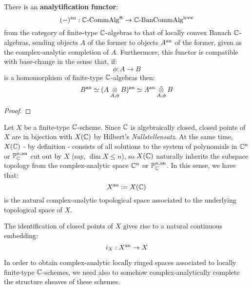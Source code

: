         \begin{lemma} \label{lemma: complex_analytic_completions_of_finite_type_C_algebras}
            There is an \textbf{analytification functor}:
                $$(-)^{\mathrm{an}}: \mathbb{C}\text{-}\mathrm{Comm}\mathrm{Alg}^{\mathrm{ft}} \to \mathbb{C}\text{-}\mathrm{Ban}\mathrm{Comm}\mathrm{Alg}^{\mathrm{lcvx}}$$
            from the category of finite-type $\mathbb{C}$-algebras to that of locally convex Banach $\mathbb{C}$-algebras, sending objects $A$ of the former to objects $A^{\mathrm{an}}$ of the former, given as the complex-analytic completion of $A$. Furthermore, this functor is compatible with base-change in the sense that, if:
                $$\phi: A \to B$$
            is a homomorphism of finite-type $\mathbb{C}$-algebras then:
                $$B^{\an} \cong (A \tensor_{A, \phi} B)^{\an} \cong A^{\an} \hattensor_{A, \phi} B$$
        \end{lemma}
            \begin{proof}
                
            \end{proof}
        \begin{remark} \label{remark: associated_complex_analytic_topological_spaces}
            Let $X$ be a finite-type $\mathbb{C}$-scheme. Since $\mathbb{C}$ is algebraically closed, closed points of $X$ are in bijection with $X(\mathbb{C})$ by Hilbert's \textit{Nullstellensatz}. At the same time, $X(\mathbb{C})$ - by definition - consists of all solutions to the system of polynomials in $\mathbb{C}^n$ or $\mathbb{P}^{n, \mathrm{an}}_{\mathbb{C}}$ cut out by $X$ (say, $\dim X \leq n$), so $X(\mathbb{C})$ naturally inherits the subspace topology from the complex-analytic space $\mathbb{C}^n$ or $\mathbb{P}^{n, \mathrm{an}}_{\mathbb{C}}$. In this sense, we have that:
                $$X^{\mathrm{an}} := X(\mathbb{C})$$
            is the natural complex-analytic topological space associated to the underlying topological space of $X$.

            The identification of closed points of $X$ gives rise to a natural continuous embedding:
                $$i_X: X^{\mathrm{an}} \to X$$
        \end{remark}
        In order to obtain complex-analytic locally ringed spaces associated to locally finite-type $\mathbb{C}$-schemes, we need also to somehow complex-analytically complete the structure sheaves of these schemes. 

